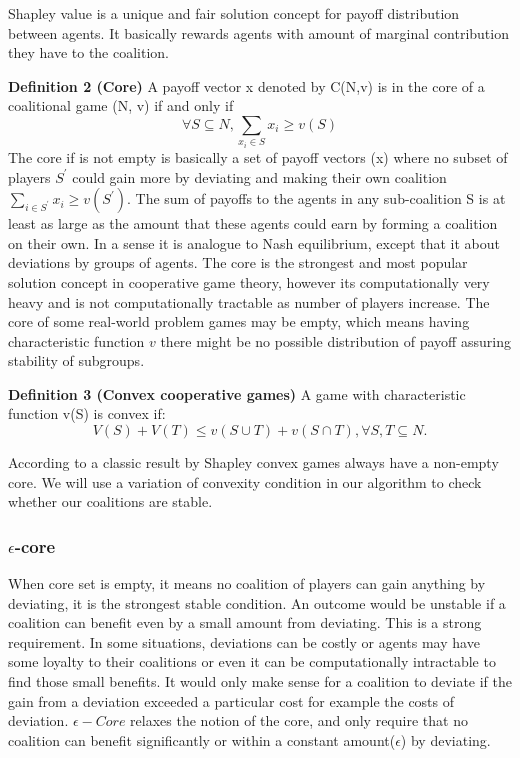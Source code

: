 \documentclass[10pt, conference, compsocconf]{IEEEtran}
\theoremstyle{plain}
\theoremstyle{definition}
\begin{document}
Shapley value is a unique and fair solution concept for payoff distribution between agents. It basically rewards agents with amount of marginal contribution they have to the coalition.


{\bf Definition 2 (Core)} A payoff vector x denoted by C(N,v) is in the core of a coalitional game (N, v) if and only if
\begin{equation}\label{eq:core}
\forall S \subseteq N, \sum_{x_i \in S} x_i \geq v(S)
\end{equation}
The core if is not empty is basically a set of payoff vectors (x) where no subset of players $S^\prime$ could gain more by deviating and making their own coalition $\sum_{i \in S^\prime} x_i \geq v(S^\prime)$. The sum of payoffs to the agents in any sub-coalition S is at least as large as the amount that these agents could earn by forming a coalition on their own. In a sense it is analogue to Nash equilibrium, except that it about deviations by groups of agents. The core is the strongest and most popular solution concept in cooperative game theory, however its computationally very heavy and is not computationally tractable as number of players increase. The core of some real-world problem games may be empty, which means having characteristic function $v$ there might be no possible distribution of payoff assuring stability of subgroups.

{\bf Definition 3 (Convex cooperative games)} A game with characteristic function v(S) is convex if:
\begin{equation}\label{eq:convex}
V(S) + V(T) \leq v(S \cup T) + v (S \cap T), \forall S,T \subseteq N.
\end{equation}

According to a classic result by Shapley \cite{S1971cores} convex games always have a non-empty core. We will use a variation of convexity condition in our algorithm to check whether our coalitions are stable.

\subsubsection*{$\epsilon$-core}\label{s:epsilon}
When core set is empty, it means no coalition of players can gain anything by deviating, it is the strongest stable condition. An outcome would be unstable if a coalition can benefit even by a small amount from deviating. This is a strong requirement. In some situations, deviations can be costly or agents may have some loyalty to their coalitions or even it can be computationally intractable to find those small benefits. It would only make sense for a coalition to deviate if the gain from a deviation exceeded a particular cost for example the costs of deviation. $\epsilon-Core$ relaxes the notion of the core, and only require that no coalition can benefit significantly or within a constant amount($\epsilon$) by deviating.
\end{document}
